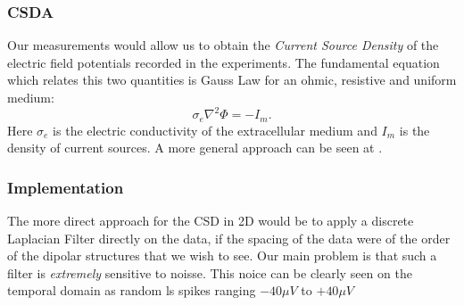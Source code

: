 \documentclass[xetex,mathserif,serif]{beamer}
\begin{document}
  \begin{frame}
    \frametitle{CSDA}
    Our measurements would allow us to obtain the \emph{Current Source Density}
    of the electric field potentials  recorded in the experiments.
    The fundamental equation which relates this two quantities is
    Gauss Law for an ohmic, resistive and uniform medium:
    \begin{equation}
      \sigma_e \nabla^2 \Phi = -I_m.
    \end{equation}
    Here $\sigma_e$ is the electric conductivity of the extracellular medium
    and $I_m$ is the density of current sources. A more general approach
    can be seen at \cite{Bedard11}.
    
  \end{frame}


  \begin{frame}
     \frametitle{Implementation}
     The more direct approach for the CSD in 2D would be to apply
     a discrete Laplacian Filter directly on the data, if
     the spacing of the data were of the order of the dipolar structures
     that we wish to see. Our main problem is that such a filter is
     \emph{extremely} sensitive to noisse. This noice can be clearly seen
     on the temporal domain as random ls spikes ranging  $-40\mu V$ to 
     $+40\mu V$ 
  \end{frame}
\end{document}
